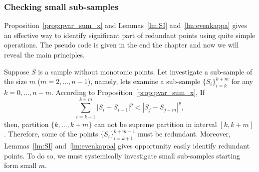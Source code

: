 \documentclass[12pt, a4paper]{article}
\numberwithin{equation}{section}
\begin{document}
\subsubsection{Checking small sub-samples}
\label{sec:CheckSubSamples}

Proposition~\ref{prop:pvar_sum_x} and 
Lemmas~\ref{lm:SI} and~\ref{lm:evenkappa} gives an effective 
way to identify significant part of 
redundant points 
using quite simple operations. 
The pseudo code is given in the end the chapter and
now we will reveal the main principles.

Suppose $S$ is a sample without monotonic points. 
Let investigate a sub-sample of the size $m$ ($m=2,\dots,n-1$), 
namely, lets examine a sub-sample 
$\{S_{i}\}_{i=k}^{k+m}$
for any $k=0,...,n-m$.
According to Proposition~\ref{prop:pvar_sum_x},
If 
\begin{equation}\label{eq:dropsamll1}
  \sum_{i=k+1}^{k+m} |S_{i}-S_{i-1}|^p < |S_j-S_{j+m}|^p,
\end{equation}
then,
partition $\{k,\dots,k+m\}$ 
can not be supreme partition in interval
$[k,k+m]$. 
Therefore, some of the points $\{S_{i}\}_{i=k+1}^{k+m-1}$
must be redundant.
Moreover, Lemmas~\ref{lm:SI} and~\ref{lm:evenkappa} 
gives opportunity easily identify 
redundant points. To do so, we must 
systemically investigate small sub-samples starting form
small $m$.
\end{document}

